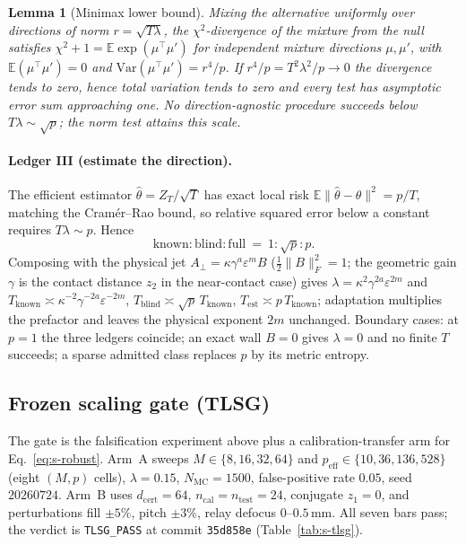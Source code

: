 \documentclass[10pt,onecolumn]{article}
\theoremstyle{plain}
\newtheorem{lemma}{Lemma}
\theoremstyle{definition}
\newcommand{\eps}{\varepsilon}
\begin{document}
\begin{lemma}[Minimax lower bound]\label{lem:s-lb}
Mixing the alternative uniformly over directions of norm $r=\sqrt{T\lambda}$, the
$\chi^2$-divergence of the mixture from the null satisfies $\chi^2+1=\mathbb E\exp(
\mu^\top\mu')$ for independent mixture directions $\mu,\mu'$, with
$\mathbb E(\mu^\top\mu')=0$ and $\mathrm{Var}(\mu^\top\mu')=r^4/p$. If
$r^4/p=T^2\lambda^2/p\to0$ the divergence tends to zero, hence total variation tends
to zero and every test has asymptotic error sum approaching one. No
direction-agnostic procedure succeeds below $T\lambda\sim\sqrt p$; the norm test
attains this scale.
\end{lemma}

\paragraph{Ledger III (estimate the direction).}
The efficient estimator $\hat\theta=Z_T/\sqrt T$ has exact local risk
$\mathbb E\lVert\hat\theta-\theta\rVert^2=p/T$, matching the Cram\'er--Rao bound, so
relative squared error below a constant requires $T\lambda\sim p$. Hence
\begin{equation}
\text{known}:\text{blind}:\text{full}\ =\ 1:\sqrt p:p.
\label{eq:s-ladder}
\end{equation}
Composing with the physical jet $A_\perp=\kappa\gamma^a\eps^m B$
($\tfrac12\lVert B\rVert_F^2=1$; the geometric gain $\gamma$ is the contact distance
$z_2$ in the near-contact case) gives $\lambda=\kappa^2\gamma^{2a}\eps^{2m}$ and
$T_{\mathrm{known}}\asymp\kappa^{-2}\gamma^{-2a}\eps^{-2m}$, $T_{\mathrm{blind}}\asymp
\sqrt p\,T_{\mathrm{known}}$, $T_{\mathrm{est}}\asymp p\,T_{\mathrm{known}}$;
adaptation multiplies the prefactor and leaves the physical exponent $2m$ unchanged.
Boundary cases: at $p=1$ the three ledgers coincide; an exact wall $B=0$ gives
$\lambda=0$ and no finite $T$ succeeds; a sparse admitted class replaces $p$ by its
metric entropy.

\subsection{Frozen scaling gate (TLSG)}\label{sec:s4gate}
The gate is the falsification experiment above plus a calibration-transfer arm for
Eq.~\eqref{eq:s-robust}. Arm~A sweeps $M\in\{8,16,32,64\}$ and $p_{\mathrm{eff}}\in
\{10,36,136,528\}$ (eight $(M,p)$ cells), $\lambda=0.15$, $N_{\mathrm{MC}}=1500$,
false-positive rate $0.05$, seed $20260724$. Arm~B uses $d_{\mathrm{cert}}=64$,
$n_{\mathrm{cal}}=n_{\mathrm{test}}=24$, conjugate $z_1=0$, and perturbations
fill $\pm5\%$, pitch $\pm3\%$, relay defocus $0$--$0.5\,$mm. All seven bars pass;
the verdict is \texttt{TLSG\_PASS} at commit \texttt{35d858e}
(Table~\ref{tab:s-tlsg}).
\end{document}
